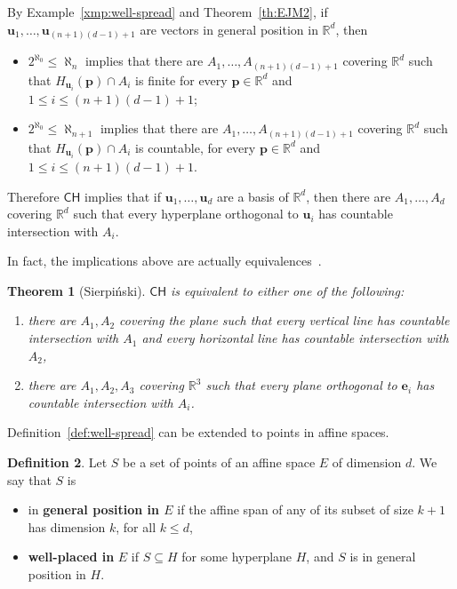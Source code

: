 \documentclass[12pt]{amsart}
\newcommand{\CH}{{\mathsf{CH}}}	%
\newcommand{\R}{\mathbb{R}}	%
\newcommand{\markdef}[1]{\textbf{#1}} %
\theoremstyle{plain}
\newtheorem{theorem}{Theorem}[section]
\theoremstyle{definition}
\newtheorem{definition}[theorem]{Definition}
\theoremstyle{remark}
\begin{document}
By Example~\ref{xmp:well-spread} and Theorem~\ref{th:EJM2}, if \( \mathbf{u}_1 , \dots , \mathbf{u}_{ ( n + 1 ) ( d - 1 ) + 1 } \) are vectors in general position in \( \R^d \), then

\begin{itemize}
\item
\( 2^{\aleph_0} \leq \aleph_{n} \) implies that there are \( A_1 , \dots , A_{ ( n + 1 ) ( d - 1 ) + 1 } \) covering \( \R^d \) such that \( H_{\mathbf{u}_i} ( \mathbf{p} ) \cap A_i \) is finite for every \( \mathbf{p} \in \R^d \) and \( 1 \leq i \leq ( n + 1 ) ( d - 1 ) + 1 \);
\item
\( 2^{\aleph_0} \leq \aleph_{ n + 1} \) implies that there are \( A_1 , \dots , A_{ ( n + 1 ) ( d - 1 ) + 1 } \) covering \( \R^d \) such that \( H_{\mathbf{u}_i} ( \mathbf{p} ) \cap A_i \) is countable, for every \( \mathbf{p} \in \R^d \) and \( 1 \leq i \leq ( n + 1 ) ( d - 1 ) + 1 \).
\end{itemize}

Therefore \( \CH \) implies that if \( \mathbf{u}_1 , \dots , \mathbf{u}_d \) are a basis of \( \R^d \), then there are \( A_1 , \dots , A_ d \) covering \( \R^d \) such that every hyperplane orthogonal to \( \mathbf{u}_i \) has countable intersection with \( A_i \).

In fact, the implications above are actually equivalences~\cite[pp.~71, 327--328]{Komjath:2006fj}.

\begin{theorem}[Sierpiński]\label{th:Sierpinski}
\( \CH \) is equivalent to either one of the following:
\begin{enumerate}[label={\upshape (\alph*)}]
\item\label{th:Sierpinski-a}
there are \( A_1 , A_2 \) covering the plane such that every vertical line has countable intersection with \( A_1 \) and every horizontal line has countable intersection with \( A_2 \),
\item\label{th:Sierpinski-b}
there are \( A_1 , A_2 , A_3 \) covering \( \R^3 \) such that every plane orthogonal to \( \mathbf{e}_i \) has countable intersection with \( A_i \).
\end{enumerate}
\end{theorem}

Definition~\ref{def:well-spread} can be extended to points in affine spaces.

\begin{definition}\label{def:generalposition}
Let \( S \) be a set of points of an affine space \( E \) of dimension \( d \). 
We say that \( S \) is 
\begin{itemize}
\item
in \markdef{general position in \( E \)} if the affine span of any of its subset of size \( k + 1 \) has dimension \( k \), for all \( k \leq d \),
\item
 \markdef{well-placed in} \( E \) if \( S \subseteq H \) for some hyperplane \( H \), and \( S \) is in general position in \( H \).
\end{itemize}
\end{definition}
\end{document}
